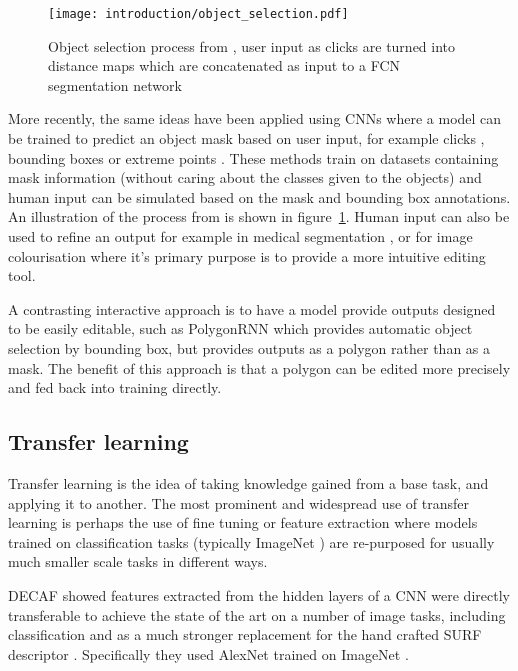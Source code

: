 \begin{figure}[h]
  \centering
  \texttt{[image: introduction/object\_selection.pdf]}
  \caption{Object selection process from \cite{Xu2016b}, user input as clicks are turned into distance maps which are concatenated as input to a \gls{FCN} segmentation network}  
  \label{fig:object_selection}
\end{figure}

More recently, the same ideas have been applied using \gls{CNN}s where a model can be trained to predict an object mask based on user input, for example clicks \cite{Xu2016b, Boroujerdi2017}, bounding boxes \cite {Xu2017} or extreme points \cite{Maninis2017}. These methods train on datasets containing mask information (without caring about the classes given to the objects) and human input can be simulated based on the mask and bounding box annotations. An illustration of the process from \cite{Xu2016b} is shown in figure~\ref{fig:object_selection}. Human input can also be used to refine an output for example in medical segmentation \cite{Wang2017}, or for image colourisation \cite{Zhang} where it's primary purpose is to provide a more intuitive editing tool.

A contrasting interactive approach is to have a model provide outputs designed to be easily editable, such as PolygonRNN \cite{Castrejon2017} which provides automatic object selection by bounding box, but provides outputs as a polygon rather than as a mask. The benefit of this approach is that a polygon can be edited more precisely and fed back into training directly.


\subsection {Transfer learning}

Transfer learning is the idea of taking knowledge gained from a base task, and applying it to another. The most prominent and widespread use of transfer learning is perhaps the use of fine tuning or feature extraction where models trained on classification tasks (typically ImageNet \cite{JiaDeng2009}) are re-purposed for usually much smaller scale tasks in different ways. 

\gls{DECAF} \cite{Donahue2014} showed features extracted from the hidden layers of a \gls{CNN} were directly transferable to achieve the state of the art on a number of image tasks, including classification and as a much stronger replacement for the hand crafted \gls{SURF} descriptor \cite{bay2006surf}.  Specifically they used AlexNet  \cite{Krizhevsky2012} trained on ImageNet \cite{JiaDeng2009}.

